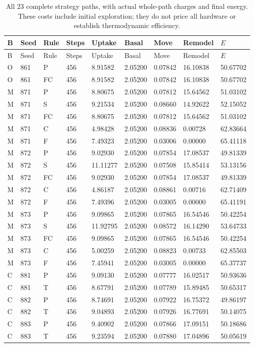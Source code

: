 \begin{longtable}{lllllllll}
\caption{All 23 complete strategy paths, with actual whole-path charges and final energy. These costs include initial exploration; they do not price all hardware or establish thermodynamic efficiency.}\label{tab:contact-ledgers}\\
\toprule
B & Seed & Rule & Steps & Uptake & Basal & Move & Remodel & $E$\\
\midrule\endfirsthead
\toprule
B & Seed & Rule & Steps & Uptake & Basal & Move & Remodel & $E$\\
\midrule\endhead
O & 861 & P & 456 & 8.91582 & 2.05200 & 0.07842 & 16.10838 & 50.67702\\
O & 861 & FC & 456 & 8.91582 & 2.05200 & 0.07842 & 16.10838 & 50.67702\\
M & 871 & P & 456 & 8.80675 & 2.05200 & 0.07812 & 15.64562 & 51.03102\\
M & 871 & S & 456 & 9.21534 & 2.05200 & 0.08660 & 14.92622 & 52.15052\\
M & 871 & FC & 456 & 8.80675 & 2.05200 & 0.07812 & 15.64562 & 51.03102\\
M & 871 & C & 456 & 4.98428 & 2.05200 & 0.08836 & 0.00728 & 62.83664\\
M & 871 & F & 456 & 7.49323 & 2.05200 & 0.03006 & 0.00000 & 65.41118\\
M & 872 & P & 456 & 9.02930 & 2.05200 & 0.07854 & 17.08537 & 49.81339\\
M & 872 & S & 456 & 11.11277 & 2.05200 & 0.07508 & 15.85414 & 53.13156\\
M & 872 & FC & 456 & 9.02930 & 2.05200 & 0.07854 & 17.08537 & 49.81339\\
M & 872 & C & 456 & 4.86187 & 2.05200 & 0.08861 & 0.00716 & 62.71409\\
M & 872 & F & 456 & 7.49396 & 2.05200 & 0.03005 & 0.00000 & 65.41191\\
M & 873 & P & 456 & 9.09865 & 2.05200 & 0.07865 & 16.54546 & 50.42254\\
M & 873 & S & 456 & 11.92795 & 2.05200 & 0.08572 & 16.14290 & 53.64733\\
M & 873 & FC & 456 & 9.09865 & 2.05200 & 0.07865 & 16.54546 & 50.42254\\
M & 873 & C & 456 & 5.00259 & 2.05200 & 0.08823 & 0.00733 & 62.85503\\
M & 873 & F & 456 & 7.45941 & 2.05200 & 0.03005 & 0.00000 & 65.37737\\
C & 881 & P & 456 & 9.09130 & 2.05200 & 0.07777 & 16.02517 & 50.93636\\
C & 881 & T & 456 & 8.67791 & 2.05200 & 0.07789 & 15.89485 & 50.65317\\
C & 882 & P & 456 & 8.74691 & 2.05200 & 0.07922 & 16.75372 & 49.86197\\
C & 882 & T & 456 & 9.04893 & 2.05200 & 0.07926 & 16.77691 & 50.14075\\
C & 883 & P & 456 & 9.40902 & 2.05200 & 0.07866 & 17.09151 & 50.18686\\
C & 883 & T & 456 & 9.23594 & 2.05200 & 0.07880 & 17.04896 & 50.05619\\
\bottomrule
\end{longtable}
